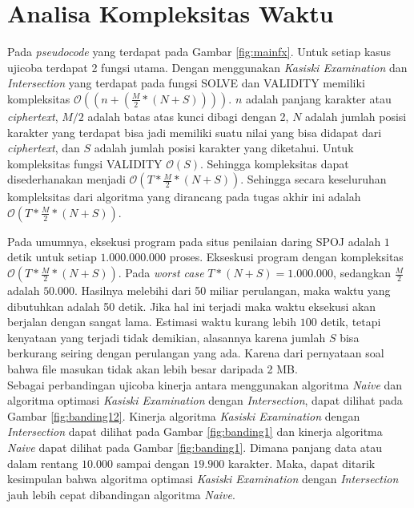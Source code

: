 \section{Analisa Kompleksitas Waktu}
Pada \textit{pseudocode} yang terdapat pada Gambar \ref{fig:mainfx}. Untuk setiap kasus ujicoba terdapat 2 fungsi utama. Dengan menggunakan \textit{Kasiski Examination} dan \textit{Intersection} yang terdapat pada fungsi SOLVE dan VALIDITY memiliki kompleksitas $\mathcal{O}((n+(\frac{M}{2}*(N+S))))$. $n$ adalah panjang karakter \plaintext atau \textit{ciphertext}, $M/2$ adalah batas atas kunci dibagi dengan 2, $N$ adalah jumlah posisi karakter yang terdapat bisa jadi memiliki suatu nilai yang bisa didapat dari \textit{ciphertext}, dan $S$ adalah jumlah posisi karakter yang diketahui. Untuk kompleksitas fungsi VALIDITY $\mathcal{O}(S)$. Sehingga kompleksitas dapat disederhanakan menjadi $\mathcal{O}(T*\frac{M}{2}*(N+S))$.
\indent Sehingga secara keseluruhan kompleksitas dari algoritma yang dirancang pada tugas akhir ini adalah $\mathcal{O}(T*\frac{M}{2}*(N+S))$.

Pada umumnya, eksekusi program pada situs penilaian daring SPOJ adalah $ 1 $ detik untuk setiap $ 1.000.000.000 $ proses. Ekseskusi program dengan kompleksitas $\mathcal{O}(T*\frac{M}{2}*(N+S))$. Pada \textit{worst case} $T*(N+S)=1.000.000$, sedangkan $\frac{M}{2}$ adalah $50.000$. Hasilnya melebihi dari 50 miliar perulangan, maka waktu yang dibutuhkan adalah 50 detik. Jika hal ini terjadi maka waktu eksekusi akan berjalan dengan sangat lama. Estimasi waktu kurang lebih $100$ detik, tetapi kenyataan yang terjadi tidak demikian, alasannya karena jumlah $S$ bisa berkurang seiring dengan perulangan yang ada. Karena dari pernyataan soal bahwa file masukan tidak akan lebih besar daripada 2 MB\cite{piwakowski_crypto4_2004}.
\\
Sebagai perbandingan ujicoba kinerja antara menggunakan algoritma \textit{Naive} dan algoritma optimasi \textit{Kasiski Examination} dengan \textit{Intersection}, dapat dilihat pada Gambar \ref{fig:banding12}. Kinerja algoritma \textit{Kasiski Examination} dengan \textit{Intersection} dapat dilihat pada Gambar \ref{fig:banding1} dan kinerja algoritma \textit{Naive} dapat dilihat pada Gambar \ref{fig:banding1}. Dimana panjang data \plaintext atau \ciphertext dalam rentang $10.000$ sampai dengan $19.900$ karakter. Maka, dapat ditarik kesimpulan bahwa algoritma optimasi \textit{Kasiski Examination} dengan \textit{Intersection} jauh lebih cepat dibandingan algoritma \textit{Naive}.
	
